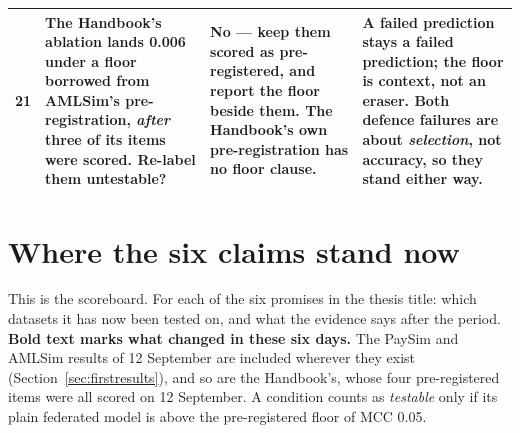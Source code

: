 \documentclass[11pt]{article}
\begin{document}
{\begin{xltabular}{\linewidth}{@{}p{0.35cm} >{\raggedright\arraybackslash}p{3.1cm} >{\raggedright\arraybackslash}p{4.4cm} X@{}}
21 & The Handbook's ablation lands 0.006 under a floor borrowed from AMLSim's pre-registration, \emph{after} three of its items were scored. Re-label them untestable? & \textbf{No --- keep them scored as pre-registered}, and report the floor beside them. The Handbook's own pre-registration has no floor clause. & A failed prediction stays a failed prediction; the floor is context, not an eraser. Both defence failures are about \emph{selection}, not accuracy, so they stand either way. \\
\bottomrule
\end{xltabular}}

\section{Where the six claims stand now}
\label{sec:claims}

This is the scoreboard. For each of the six promises in the thesis title: which datasets it has now been
tested on, and what the evidence says after the period. \textbf{Bold text marks what changed in these
six days.} The PaySim and AMLSim results of 12 September are included wherever they exist
(Section~\ref{sec:firstresults}), and so are the Handbook's, whose four pre-registered items were all
scored on 12 September. A condition counts as \emph{testable} only
if its plain federated model is above the pre-registered floor of MCC 0.05.
\end{document}

